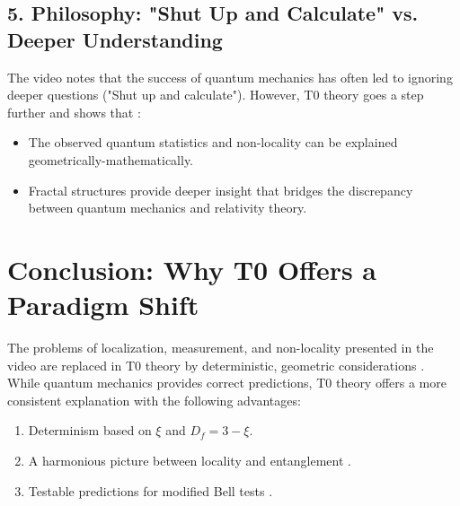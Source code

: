 	\subsection*{5. Philosophy: "Shut Up and Calculate" vs. Deeper Understanding}
	
	The video notes that the success of quantum mechanics has often led to ignoring deeper questions ("Shut up and calculate"). However, T0 theory goes a step further and shows that \cite{NoGoEn}:
	\begin{itemize}
		\item The observed quantum statistics and non-locality can be explained geometrically-mathematically.
		\item Fractal structures provide deeper insight that bridges the discrepancy between quantum mechanics and relativity theory.
	\end{itemize}
	
	\section*{Conclusion: Why T0 Offers a Paradigm Shift}
	
	The problems of localization, measurement, and non-locality presented in the video \cite{VideoBell2024} are replaced in T0 theory by deterministic, geometric considerations \cite{Bell_En}. While quantum mechanics provides correct predictions, T0 theory offers a more consistent explanation with the following advantages:
	
	\begin{enumerate}
		\item Determinism based on $\xi$ and $D_f = 3 - \xi$.
		\item A harmonious picture between locality and entanglement \cite{131_scheinbar_instantan_En}.
		\item Testable predictions for modified Bell tests \cite{DynMassePhotonenNichtlokalEn, 023_Bell_En_ch}.
	\end{enumerate}
	
